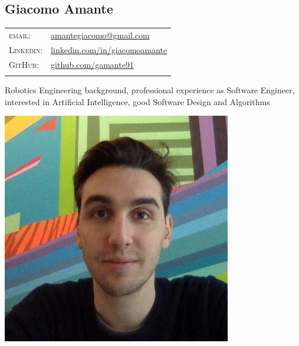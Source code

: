 \documentclass[a4paper,10pt]{article}
\begin{document}
   \pagestyle{empty}

   \begin{minipage}{0.75\textwidth}
      \vspace{-10mm}
      \begin{flushleft}
         \section{\Huge Giacomo Amante}
         \vspace{2mm}
         \begin{tabular}{ll}
            \textsc{email:} & \href{mailto:amantegiacomo@gmail.com}{amantegiacomo@gmail.com} \\
            \textsc{Linkedin:} & 
            \href{http://www.linkedin.com/in/giacomoamante}{\color{black}linkedin.com/in/giacomoamante}\\
            \textsc{GitHub:} & \href{https://github.com/gamante91}{github.com/gamante91}\\
            \multicolumn{2}{c}{} \\
         \end{tabular}
      \end{flushleft}
   Robotics Engineering background, professional experience as Software Engineer,\\
   interested in Artificial Intelligence, good Software Design and Algorithms\\
   \end{minipage}
   \begin{minipage}[c]{0.25\textwidth}
      \begin{center}
         \includegraphics[width=0.75\textwidth]{GiacomoAmante_lowres}
      \end{center}
   \end{minipage}
\end{document}
